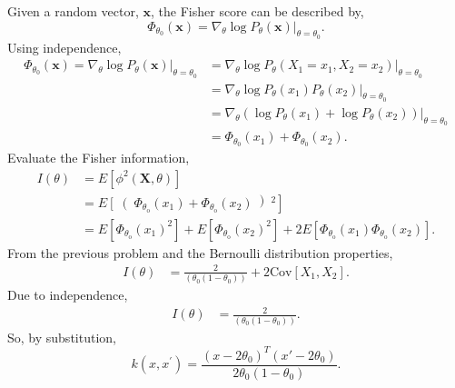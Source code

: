 \documentclass{article}[12pt]
\begin{document}
\begin{enumerate}
Given a random vector, $\mathbf x$, the Fisher score can be described by,
\begin{equation}
\Phi_{\theta_{0}}(\mathbf{x})=\left.\nabla_{\theta} \log P_{\theta}(\mathbf{x})\right|_{\theta=\theta_{0}}.
\end{equation}
Using independence,
\begin{equation}
\begin{aligned}
\Phi_{\theta_{0}}(\mathbf{x})=\left.\nabla_{\theta} \log P_{\theta}(\mathbf{x})\right|_{\theta=\theta_{0}} &= \left.\nabla_{\theta} \log P_{\theta}(X_1 =x_1, X_2=x_2)\right|_{\theta=\theta_{0}} \\
&= \left.\nabla_{\theta} \log P_{\theta}(x_1) P_{\theta}(x_2)\right|_{\theta=\theta_{0}} \\
&=\left.  \nabla_{\theta} \left( \log P_{\theta}(x_1)  + \log P_{\theta}(x_2) \right)\right|_{\theta=\theta_{0}}\\
&=\Phi_{\theta_{0}}(x_1)+ \Phi_{\theta_{0}}(x_2).
\end{aligned}
\end{equation}
Evaluate the Fisher information,
\begin{equation}
\begin{aligned}
I(\theta)&=E\left[\phi^{2}(\mathbf X, \theta)\right] \\
&= E \left[ \right( \Phi_{\theta_{\mathrm{o}}}\left(x_{1}\right)+\Phi_{\theta_{\mathrm{o}}}\left(x_{2}\right) \left)^2 \right] \\
&= E\left[ \Phi_{\theta_{\mathrm{o}}}\left(x_{1}\right)^2  \right] +  E\left[ \Phi_{\theta_{\mathrm{o}}}\left(x_{2}\right)^2  \right] + 2  E\left[ \Phi_{\theta_{\mathrm{o}}}\left(x_{1}\right)   \Phi_{\theta_{\mathrm{o}}}\left(x_{2}\right)   \right].
\end{aligned}
\end{equation}
From the previous problem and the Bernoulli distribution properties,
\begin{equation}
\begin{aligned}
I(\theta)&= \frac{2}{\left(\theta_0 \left( 1- \theta_0 \right)\right)} + 2 \text{Cov}\left[ X_1, X_2\right].
\end{aligned}
\end{equation}
Due to independence,
\begin{equation}
\begin{aligned}
I(\theta)&= \frac{2}{\left(\theta_0 \left( 1- \theta_0 \right)\right)} .
\end{aligned}
\end{equation}
So, by substitution,
\begin{equation}
k\left(x, x^{\prime}\right) = \frac{{{{\left( {x - 2{\theta _0}} \right)}^T}\left( {x' - 2{\theta _0}} \right)}}{{2{\theta _0}\left( {1 - {\theta _0}} \right)}}.
\end{equation}


\end{enumerate}
 
\end{document}
